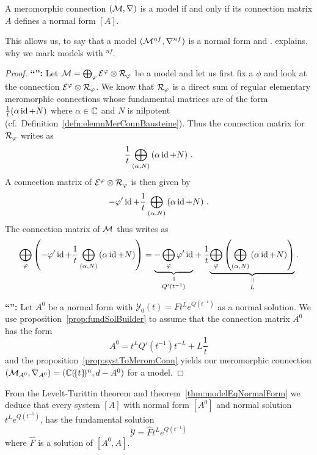 \begin{thm}\label{thm:modelEqNormalForm}
  A meromorphic connection $(\mathcal{M},\nabla)$ is a model if and only if its
  connection matrix $A$ defines a normal form $[A]$.
  \begin{s-rem}
    This allows us, to say that a model $(\mathcal{M}^{nf},\nabla^{nf})$ is a normal
    form and .
     explains, why we mark models with ${}^{nf}$.
  \end{s-rem}
\end{thm}
\begin{proof}
  \textbf{``\Rightarrow{}'':}
  Let $\mathcal{M}=\bigoplus_{\varphi}\mathcal{E}^\varphi\otimes\mathcal{R}_\varphi$ be a model and let us first
  fix a $\phi$ and look at the connection $\mathcal{E}^\varphi\otimes\mathcal{R}_\varphi$.
  We know that $\mathcal{R}_\varphi$ is a direct sum of regular elementary meromorphic
  connections whose fundamental matrices are of the form
  $\frac{1}{t}(\alpha\operatorname{id}+N)$ where $\alpha\in\mathbb{C}$ and $N$ is nilpotent
  (cf.\ Definition~\ref{defn:elemnMerConnBausteine}).
  Thus the connection matrix for $\mathcal{R}_\varphi$ writes as
  \[
    \frac{1}{t} \bigoplus_{(\alpha,N)}\left( \alpha\operatorname{id}+N\right)
    \,.
  \]
  A connection matrix of $\mathcal{E}^\varphi\otimes\mathcal{R}_\varphi$ is then given by
  \[
    -\varphi'\operatorname{id} + \frac{1}{t} \bigoplus_{(\alpha,N)}\left( \alpha\operatorname{id}+N\right) \,.
  \]
  The connection matrix of $\mathcal{M}$ thus writes as
  \[
    \bigoplus_\phi\left(
      -\phi'\id + \frac{1}{t} \bigoplus_{(\alpha,N)}\left( \alpha\id+N\right)
    \right)
    =
    \underset{Q'(t^{-1})}{
      \underset{\text{\rotatebox[origin=c]{-90}{$=$}}}{%
        \underbrace{-\bigoplus_\phi \phi'\id}
      }
    }
    +
    \frac{1}{t}
    \underset{L}{
      \underset{\text{\rotatebox[origin=c]{-90}{$=$}}}{%
        \underbrace{%
          \bigoplus_\phi\left(
            \bigoplus_{(\alpha,N)}\left( \alpha\id+N\right)
          \right)
        }
      }
    }
    \,.
  \]

  \TODO{}

  \textbf{``\Leftarrow{}'':}
  Let $A^0$ be a normal form with $\mathcal{Y}_0(t)=F t^L e^{Q(t^{-1})}$ as a
  normal solution. We use proposition~\ref{prop:fundSolBuilder} to assume that
  the connection matrix $A^0$ has the form
  \[
    A^0=t^LQ'(t^{-1})t^{-L}+L\frac{1}{t}
  \]
  and the proposition~\ref{prop:systToMeromConn} yields our meromorphic
  connection $(\mathcal{M}_{A^0},\nabla_{A^0})=(\mathbb{C}(\!\{t\}\!)^n,d-A^0)$ for
   a model.
  \TODO[Jordan-NF]
\end{proof}
\begin{cor}
  From the Levelt-Turittin theorem and theorem~\ref{thm:modelEqNormalForm} we
  deduce that every system $[A]$ with normal form $[A^0]$ and normal solution
  $t^L e^{Q(t^{-1})}$, has the fundamental solution
  \[
    \mathcal{Y}=\hat F t^L e^{Q(t^{-1})}
  \]
  where $\hat F$ is a solution of $[A^0,A]$.
\end{cor}

